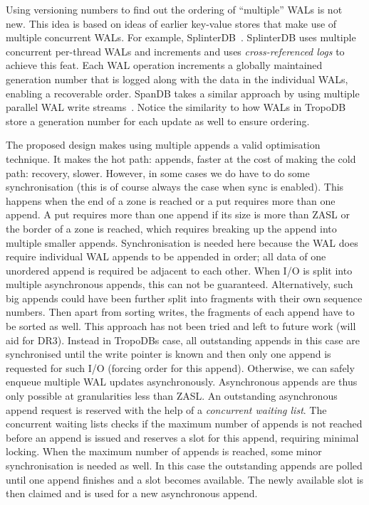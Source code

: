 Using versioning numbers to find out the ordering of ``multiple'' WALs is not new. This idea is based on ideas of earlier key-value stores that make use of multiple concurrent WALs. For example, SplinterDB~\cite{conway2020splinterdb}. SplinterDB uses multiple concurrent per-thread WALs and increments and uses \textit{cross-referenced logs} to achieve this feat. Each WAL operation increments a globally maintained generation number that is logged along with the data in the individual WALs, enabling a recoverable order. SpanDB takes a similar approach by using multiple parallel WAL write streams~\cite{chen2021spandb}. Notice the similarity to how WALs in TropoDB store a generation number for each update as well to ensure ordering.

 The proposed design makes using multiple appends a valid optimisation technique. It makes the hot path: appends, faster at the cost of making the cold path: recovery, slower. However, in some cases we do have to do some synchronisation (this is of course always the case when sync is enabled). This happens when the end of a zone is reached or a put requires more than one append. A put requires more than one append if its size is more than ZASL or the border of a zone is reached, which requires breaking up the append into multiple smaller appends. Synchronisation is needed here because the WAL does require individual WAL appends to be appended in order; all data of one unordered append is required be adjacent to each other. When I/O is split into multiple asynchronous appends, this can not be guaranteed. Alternatively, such big appends could have been further split into fragments with their own sequence numbers. Then apart from sorting writes, the fragments of each append have to be sorted as well. This approach has not been tried and left to future work (will aid for DR3). Instead in TropoDBs case, all outstanding appends in this case are synchronised until the write pointer is known and then only one append is requested for such I/O (forcing order for this append). Otherwise, we can safely enqueue multiple WAL updates asynchronously. Asynchronous appends are thus only possible at granularities less than ZASL. An outstanding asynchronous append request is reserved with the help of a \textit{concurrent waiting list}. The concurrent waiting lists checks if the maximum number of appends is not reached before an append is issued and reserves a slot for this append, requiring minimal locking. When the maximum number of appends is reached, some minor synchronisation is needed as well. In this case the outstanding appends are polled until one append finishes and a slot becomes available. The newly available slot is then claimed and is used for a new asynchronous append.    


